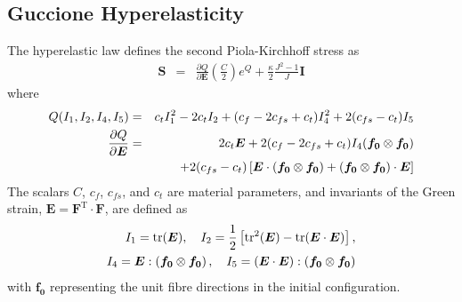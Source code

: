 \documentclass[sn-mathphys,Numbered]{sn-jnl}%
\begin{document}
\begin{appendices}
\subsection{Guccione Hyperelasticity}
The \citet{Guccione1995} hyperelastic law defines the second Piola-Kirchhoff stress as
\begin{eqnarray}
	\boldsymbol{S}
		&=& \frac{\partial Q}{\partial \boldsymbol{E} } \left( \frac{C}{2} \right) e^Q + \frac{\kappa}{2} \frac{J^2 - 1}{J} \textbf{I} 
\end{eqnarray}
where
\begin{eqnarray}
	Q(I_1, I_2, I_4, I_5) &=& c_t I_1^2 - 2 c_t I_2 + (c_f - 2c_{fs} + c_t) I_4^2   + 2(c_{fs} - c_t) I_5 \\
	\frac{\partial Q}{\partial \boldsymbol{E} }
		&=&  2 c_t \boldsymbol{E} + 2(c_f - 2 c_{fs} + c_t)I_4 ( \boldsymbol{f_0} \otimes \boldsymbol{f_0} ) \notag \\
		&&+ 2(c_{fs} - c_t)\left[\boldsymbol{E} \cdot  (\boldsymbol{f_0} \otimes \boldsymbol{f_0}) + ( \boldsymbol{f_0} \otimes \boldsymbol{f_0} ) \cdot \boldsymbol{E} \right]
\end{eqnarray}
The scalars $C$, $c_f$, $c_{fs}$, and $c_t$ are material parameters, and invariants of the Green strain, $\boldsymbol{E} = \boldsymbol{F}^{\text{T}} \cdot \boldsymbol{F}$, are defined as
\begin{eqnarray}
	I_1 = \text{tr}(\boldsymbol{E}), \quad
	I_2 =  \frac{1}{2} \left[ \text{tr}^2(\boldsymbol{E}) - \text{tr}(\boldsymbol{E} \cdot \boldsymbol{E}) \right], \notag \\
	I_4 = \boldsymbol{E}  : \left( \boldsymbol{f_0} \otimes \boldsymbol{f_0} \right), \quad 
	I_5 = \left( \boldsymbol{E} \cdot \boldsymbol{E} \right): \left( \boldsymbol{f_0} \otimes \boldsymbol{f_0} \right)
\end{eqnarray}
with $\boldsymbol{f_0}$ representing the unit fibre directions in the initial configuration.



\end{appendices}
\end{document}
